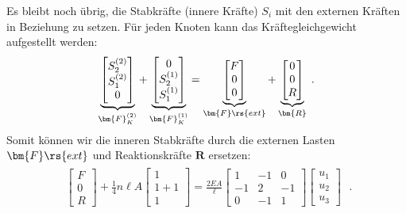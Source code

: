 \documentclass[letterpaper,10pt,german]{jupyterBook}
\begin{document}
\sphinxAtStartPar
Es bleibt noch übrig, die Stabkräfte (innere Kräfte) \(S_i\) mit den externen Kräften in Beziehung zu setzen. Für jeden Knoten kann das Kräftegleichgewicht aufgestellt werden:
\begin{equation}\label{equation:chapters/chapter2/1dFEM:stabFEM8}
\begin{split}\underbrace{\begin{bmatrix}
S_2^{(2)} \\
S_1^{(2)} \\
0
\end{bmatrix}}_{\bm{F}_K^{(2)}} + \underbrace{\begin{bmatrix}
0 \\
S_2^{(1)} \\
S_1^{(1)}
\end{bmatrix}}_{\bm{F}_K^{(1)}} = \underbrace{\begin{bmatrix}
F \\
0 \\
0
\end{bmatrix}}_{\bm{F}\rs{ext}} + \underbrace{\begin{bmatrix}
0 \\
0 \\
R
\end{bmatrix}}_{\bm{R}} \;.\end{split}
\end{equation}
\sphinxAtStartPar
Somit können wir die inneren Stabkräfte durch die externen Lasten \(\bm{F}\rs{ext}\) und Reaktionskräfte \(\bm{R}\) ersetzen:
\begin{equation}\label{equation:chapters/chapter2/1dFEM:stabFEM9}
\begin{split}\begin{align}
\begin{bmatrix}
F \\
0 \\
R
\end{bmatrix} + \frac{1}{4}n\ell A \begin{bmatrix}
1 \\
1+1\\
1
\end{bmatrix} = \frac{2EA}{\ell}\begin{bmatrix}
1 & -1 & 0\\
-1 & 2 & -1\\
0 & -1 & 1
\end{bmatrix} \begin{bmatrix}
u_1 \\
u_2\\
u_3
\end{bmatrix}
\end{align} \; .\end{split}
\end{equation}
\end{document}
